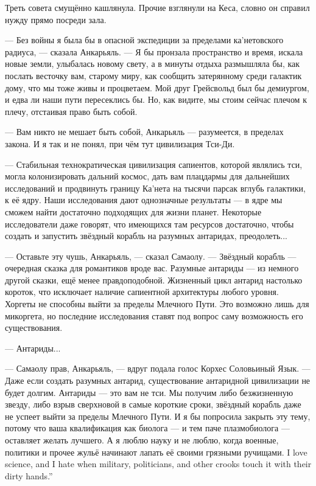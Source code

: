 Треть совета смущённо кашлянула.
Прочие взглянули на Кеса, словно он справил нужду прямо посреди зала.

--- Без войны я была бы в опасной экспедиции за пределами ка'нетовского радиуса, --- сказала Анкарьяль.
--- Я бы пронзала пространство и время, искала новые земли, улыбалась новому свету, а в минуты отдыха размышляла бы, как послать весточку вам, старому миру, как сообщить затерянному среди галактик дому, что мы тоже живы и процветаем.
Мой друг Грейсвольд был бы демиургом, и едва ли наши пути пересеклись бы.
Но, как видите, мы стоим сейчас плечом к плечу, отстаивая право быть собой.

--- Вам никто не мешает быть собой, Анкарьяль --- разумеется, в пределах закона.
И я так и не понял, при чём тут цивилизация Тси-Ди.

--- Стабильная технократическая цивилизация сапиентов, которой являлись тси, могла колонизировать дальний космос, дать вам плацдармы для дальнейших исследований и продвинуть границу Ка'нета на тысячи парсак вглубь галактики, к её ядру.
Наши исследования дают однозначные результаты --- в ядре мы сможем найти достаточно подходящих для жизни планет.
Некоторые исследователи даже говорят, что имеющихся там ресурсов достаточно, чтобы создать и запустить звёздный корабль на разумных антаридах, преодолеть...

--- Оставьте эту чушь, Анкарьяль, --- сказал Самаолу.
--- Звёздный корабль --- очередная сказка для романтиков вроде вас.
Разумные антариды --- из немного другой сказки, ещё менее правдоподобной.
Жизненный цикл антарид настолько короток, что исключает наличие сапиентной архитектуры любого уровня.
Хоргеты не способны выйти за пределы Млечного Пути.
Это возможно лишь для микоргета, но последние исследования ставят под вопрос саму возможность его существования.

--- Антариды...

--- Самаолу прав, Анкарьяль, --- вдруг подала голос Корхес Соловьиный Язык.
--- Даже если создать разумных антарид, существование антаридной цивилизации не будет долгим.
Антариды --- это вам не тси.
Мы получим либо безжизненную звезду, либо взрыв сверхновой в самые короткие сроки, звёздный корабль даже не успеет выйти за пределы Млечного Пути.
И я бы попросила закрыть эту тему, потому что ваша квалификация как биолога --- и тем паче плазмобиолога --- оставляет желать лучшего.
{А я люблю науку и не люблю, когда военные, политики и прочее жульё начинают лапать её своими грязными ручищами.}
{I love science, and I hate when military, politicians, and other crooks touch it with their dirty hands.''}

